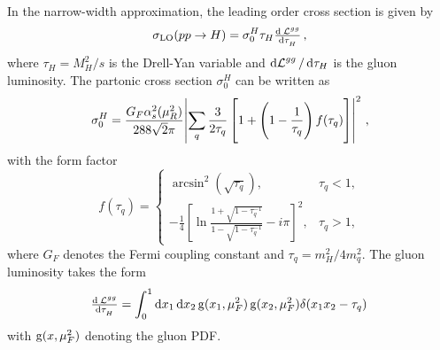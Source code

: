 In the narrow-width approximation, the leading order cross section is given by \cite{gluonfusioncrosssection}
%
\begin{equation}
	\sigma_\text{LO}(pp \rightarrow H) = \sigma_0^H \tau_H \od{\lumi^{gg}}{\tau_H} \, ,
\end{equation}
%
where $\tau_H = M_H^2/s$ is the Drell-Yan variable and $\dif \lumi^{gg} / \dif \tau_H$ is the gluon luminosity.
The partonic cross section $\sigma_0^H$ can be written as
\begin{equation}
	\sigma_0^H = \frac{G_F \alpha_s^2(\mu_R^2)}{288 \sqrt{2} \pi} \abs{ \sum_q \frac{3}{2 \tau_q} \left[ 1 + \left( 1 - \frac{1}{\tau_q} \right) f(\tau_q) \right] }^2  \, ,
\end{equation}
%
with the form factor
%
\begin{equation}
	f(\tau_q) = 
	\begin{cases}
		\arcsin^2 \left( \sqrt{\tau_q} \right) ,																& \tau_q < 1, \\
		- \frac{1}{4} \left[ \ln \frac{1 + \sqrt{1-\tau_q^{-1}}}{1 - \sqrt{1-\tau_q^{-1}}} -i \pi \right]^2 ,	& \tau_q > 1,
	\end{cases}
\end{equation}
%
where $G_F$ denotes the Fermi coupling constant and $\tau_q = m_H^2/4m_q^2$.
The gluon luminosity takes the form
%
\begin{equation}
	\od{\lumi^{gg}}{\tau_H} = \int_0^1 \dif x_1 \dif x_2 \gluonpdf(x_1,\mu_F^2) \gluonpdf(x_2,\mu_F^2) \delta(x_1 x_2 - \tau_q) \,
\end{equation}
%
with $\operatorname{g}(x,\mu_F^2)$ denoting the gluon PDF.

